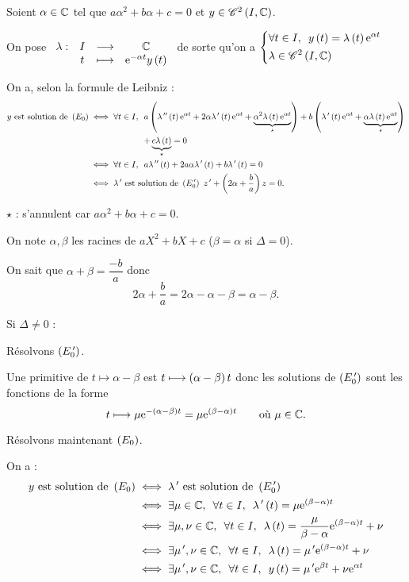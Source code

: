 \begin{dem}
Soient \(\alpha\in\mathbb{C}\) tel que \(a\alpha^2+b\alpha+c=0\) et \(y\in\mathscr{C}^{2}\left(I,\mathbb{C}\right)\).

On pose \(\begin{array}[t]{cccc}\lambda : & I & \longrightarrow & \mathbb{C} \\ & t & \longmapsto & \mathrm{e}^{-\alpha t}y\left(t\right)\end{array}\) de sorte qu'on a \(\begin{dcases}
\quantifs{\forall t\in I}y\paren{t}=\lambda\paren{t}\e{\alpha t} \\
\lambda\in\ensclasse{2}{I}{\C}
\end{dcases}\)

On a, selon la formule de Leibniz : \[\begin{aligned}
y\text{ est solution de }\paren{E_0}&\ssi\quantifs{\forall t\in I}a\paren{\lambda\seconde\paren{t}\e{\alpha t}+2\alpha\lambda\prim\paren{t}\e{\alpha t}+\underbrace{\alpha^2\lambda\paren{t}\e{\alpha t}}_{\star}}+b\paren{\lambda\prim\paren{t}\e{\alpha t}+\underbrace{\alpha\lambda\paren{t}\e{\alpha t}}_{\star}} \\
&\color{white}\ssi\quantifs{\forall t\in I}\color{black}+\underbrace{c\lambda\paren{t}}_{\star}=0 \\
&\ssi\quantifs{\forall t\in I}a\lambda\seconde\paren{t}+2a\alpha\lambda\prim\paren{t}+b\lambda\prim\paren{t}=0 \\
&\ssi\lambda\prim\text{ est solution de }\paren{E_0\prim}~z\prim+\paren{2\alpha+\dfrac{b}{a}}z=0.
\end{aligned}\]

\(\star\) : s'annulent car \(a\alpha^2+b\alpha+c=0\).

On note \(\alpha,\beta\) les racines de \(aX^2+bX+c\) (\cad \(\beta=\alpha\) si \(\Delta=0\)).

On sait que \(\alpha+\beta=\dfrac{-b}{a}\) donc \[2\alpha+\dfrac{b}{a}=2\alpha-\alpha-\beta=\alpha-\beta.\]

Si \(\Delta\not=0\) :

Résolvons \(\left(E_0^{\,\prime}\right)\).

Une primitive de \(t\mapsto\alpha-\beta\) est \(t\longmapsto\left(\alpha-\beta\right)t\) donc les solutions de \(\left(E_0^{\,\prime}\right)\) sont les fonctions de la forme \[t\longmapsto\mu\mathrm{e}^{-\left(\alpha-\beta\right)t}=\mu\mathrm{e}^{\left(\beta-\alpha\right)t}\qquad\text{où }\mu\in\mathbb{C}.\]

Résolvons maintenant \(\left(E_0\right)\).

On a : \[\begin{aligned}
y\text{ est solution de }\paren{E_0}&\ssi\lambda\prim\text{ est solution de }\paren{E_0\prim} \\
&\ssi\quantifs{\exists\mu\in\C;\forall t\in I}\lambda\prim\paren{t}=\mu\e{\paren{\beta-\alpha}t} \\
&\ssi\quantifs{\exists\mu,\nu\in\C;\forall t\in I}\lambda\paren{t}=\dfrac{\mu}{\beta-\alpha}\e{\paren{\beta-\alpha}t}+\nu \\
&\ssi\quantifs{\exists\mu\prim,\nu\in\C;\forall t\in I}\lambda\paren{t}=\mu\prim\e{\paren{\beta-\alpha}t}+\nu \\
&\ssi\quantifs{\exists\mu\prim,\nu\in\C;\forall t\in I}y\paren{t}=\mu\prim\e{\beta t}+\nu\e{\alpha t}
\end{aligned}\]


\end{dem}
